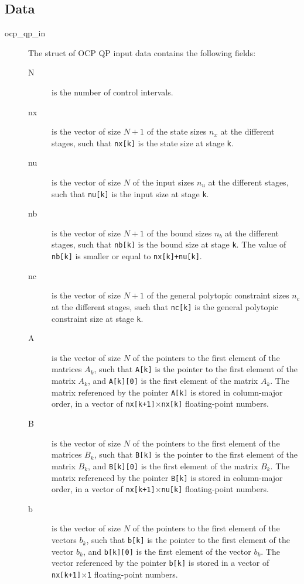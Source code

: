 \documentclass{report}
\begin{document}
\subsection{Data}
\label{sec:OCP_QP_interface_data}
\begin{description}
	\item[ocp\_qp\_in] The struct of OCP QP input data contains the following fields:
	\begin{description}
		\item[N] is the number of control intervals.
		\item[nx] is the vector of size $N+1$ of the state sizes $n_x$ at the different stages, such that \texttt{nx[k]} is the state size at stage \texttt{k}.
		\item[nu] is the vector of size $N$ of the input sizes $n_u$ at the different stages, such that \texttt{nu[k]} is the input size at stage \texttt{k}.
		\item[nb] is the vector of size $N+1$ of the bound sizes $n_b$ at the different stages, such that \texttt{nb[k]} is the bound size at stage \texttt{k}.
		The value of \texttt{nb[k]} is smaller or equal to \texttt{nx[k]+nu[k]}.
		\item[nc] is the vector of size $N+1$ of the general polytopic constraint sizes $n_c$ at the different stages, such that \texttt{nc[k]} is the general polytopic constraint size at stage \texttt{k}.
		\item[A] is the vector of size $N$ of the pointers to the first element of the matrices $A_k$, such that \texttt{A[k]} is the pointer to the first element of the matrix $A_k$, and \texttt{A[k][0]} is the first element of the matrix $A_k$.
		The matrix referenced by the pointer \texttt{A[k]} is stored in column-major order, in a vector of \texttt{nx[k+1]$\times$nx[k]} floating-point numbers.
		\item[B] is the vector of size $N$ of the pointers to the first element of the matrices $B_k$, such that \texttt{B[k]} is the pointer to the first element of the matrix $B_k$, and \texttt{B[k][0]} is the first element of the matrix $B_k$.
		The matrix referenced by the pointer \texttt{B[k]} is stored in column-major order, in a vector of \texttt{nx[k+1]$\times$nu[k]} floating-point numbers.
		\item[b] is the vector of size $N$ of the pointers to the first element of the vectors $b_k$, such that \texttt{b[k]} is the pointer to the first element of the vector $b_k$, and \texttt{b[k][0]} is the first element of the vector $b_k$.
		The vector referenced by the pointer \texttt{b[k]} is stored in a vector of \texttt{nx[k+1]$\times$1} floating-point numbers.

\end{description}
\end{description}
\end{document}
